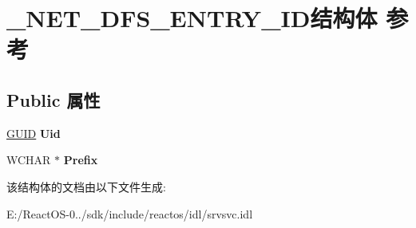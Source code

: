 \hypertarget{struct___n_e_t___d_f_s___e_n_t_r_y___i_d}{}\section{\+\_\+\+N\+E\+T\+\_\+\+D\+F\+S\+\_\+\+E\+N\+T\+R\+Y\+\_\+\+I\+D结构体 参考}
\label{struct___n_e_t___d_f_s___e_n_t_r_y___i_d}
\subsection*{Public 属性}
\begin{DoxyCompactItemize}
\item 
\mbox{\label{struct___n_e_t___d_f_s___e_n_t_r_y___i_d_a2fa4bb76d64ae12bebdd1f0e37b0417b}} 
\hyperlink{interface_g_u_i_d}{G\+U\+ID} {\bfseries Uid}
\item 
\mbox{\label{struct___n_e_t___d_f_s___e_n_t_r_y___i_d_a8b1514a896768a165384959447843af2}} 
W\+C\+H\+AR $\ast$ {\bfseries Prefix}
\end{DoxyCompactItemize}


该结构体的文档由以下文件生成\+:\begin{DoxyCompactItemize}
\item 
E\+:/\+React\+O\+S-\/0../sdk/include/reactos/idl/srvsvc.\+idl\end{DoxyCompactItemize}
